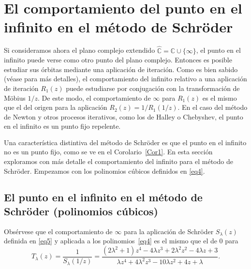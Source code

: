 \IfFileExists{aims.cls}{\documentclass{aims}}{\documentclass[11pt]{article}}
\numberwithin{equation}{section}
\theoremstyle{thmstyleone}%
\theoremstyle{thmstyletwo}%
\theoremstyle{thmstylethree}%
\begin{document}
\section{El comportamiento del punto en el infinito en el método de Schr\"oder} \label{section4}

Si consideramos ahora el plano complejo extendido $\hat{\mathbb{C}}=\mathbb{C}\cup\{\infty\}$, el punto en el infinito puede verse como otro punto del plano complejo. Entonces es posible estudiar sus órbitas mediante una aplicación de iteración. Como es bien sabido (véase \cite{14Beardon} para más detalles), el comportamiento del infinito relativo a una aplicación de iteración $R_1(z)$ puede estudiarse por conjugación con la transformación de Möbius $1/z$. De este modo, el comportamiento de $\infty$ para $R_1(z)$ es el mismo que el del origen para la aplicación $R_2(z)=1/R_1(1/z)$. En el caso del método de Newton y otros procesos iterativos, como los de Halley o Chebyshev, el punto en el infinito es un punto fijo repelente. 

Una característica distintiva del método de Schr\"oder es que el punto en el infinito no es un punto fijo, como se ve en el Corolario~\ref{Cor1}. En esta sección exploramos con más detalle el comportamiento del infinito para el método de Schr\"oder. Empezamos con los polinomios cúbicos definidos en \eqref{eq4}.

\subsection{El punto en el infinito en el método de Schr\"oder (polinomios cúbicos)}

Obsérvese que el comportamiento de $\infty$ para la aplicación de Schr\"oder $S_{\lambda}(z)$ definida en \eqref{eq5} y aplicada a los polinomios~\eqref{eq4} es el mismo que el de $0$ para
\begin{equation}\label{eq6}
T_{\lambda}(z)=\frac{1}{S_{\lambda}(1/z)}=\frac{(2 \lambda ^2 +1)z^4-4 \lambda  z^3+2 \lambda ^2 z^2-4 \lambda  z+3}{ \lambda  z^4+4
   \lambda ^2 z^3-10 \lambda  z^2+4 z+\lambda}.
\end{equation}

\end{document}
